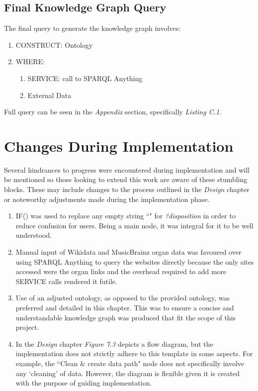 \subsection{Final Knowledge Graph Query}
\hspace*{0.5cm} The final query to generate the knowledge graph involves: 

\begin{enumerate}
    \item CONSTRUCT: Ontology
    \item WHERE:
    \begin{enumerate}
        \vspace{-0.25cm}
        \item SERVICE: call to SPARQL Anything
        \item External Data
    \end{enumerate}
\end{enumerate}

Full query can be seen in the \textit{Appendix} section, specifically \textit{Listing C.1}. 

\section{Changes During Implementation}
\hspace{0.5cm} Several hindrances to progress were encountered during implementation and will be mentioned so those looking to extend this work are aware of these stumbling blocks. These may include changes to the process outlined in the \textit{Design} chapter or noteworthy adjustments made during the implementation phase.

\begin{enumerate}
    \item IF() was used to replace any empty string ``" for \textit{?disposition} in order to reduce confusion for users. Being a main node, it was integral for it to be well understood. 
    \item Manual input of Wikidata and MusicBrainz organ data was favoured over using SPARQL Anything to query the websites directly because the only sites accessed were the organ links and the overhead required to add more SERVICE calls rendered it futile. 
    \item Use of an adjusted ontology, as opposed to the provided ontology, was preferred and detailed in this chapter. This was to ensure a concise and understandable knowledge graph was produced that fit the scope of this project. 
    \item In the \textit{Design} chapter \textit{Figure 7.3} depicts a flow diagram, but the implementation does not strictly adhere to this template in some aspects. For example, the ``Clean \& create data path" node does not specifically involve any `cleaning' of data. However, the diagram is flexible given it is created with the purpose of guiding implementation. 
\end{enumerate}

